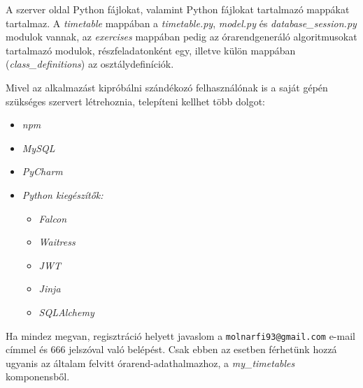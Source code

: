 A szerver oldal Python fájlokat, valamint Python fájlokat tartalmazó mappákat tartalmaz. A \textit{timetable} mappában a \textit{timetable.py}, \textit{model.py} és \textit{database\_session.py} modulok vannak, az \textit{exercises} mappában pedig az órarendgeneráló algoritmusokat tartalmazó modulok, részfeladatonként egy, illetve külön mappában (\textit{class\_definitions}) az osztálydefiníciók.

Mivel az alkalmazást kipróbálni szándékozó felhasználónak is a saját gépén szükséges szervert létrehoznia, telepíteni kellhet több dolgot:
\begin{itemize}
	\item \textit{npm}
	\item \textit{MySQL}
	\item \textit{PyCharm}
	\item \textit{Python kiegészítők:}
	\begin{itemize}
		\item \textit{Falcon}
		\item \textit{Waitress}
		\item \textit{JWT}
		\item \textit{Jinja}
		\item \textit{SQLAlchemy}
	\end{itemize}
\end{itemize}

Ha mindez megvan, regisztráció helyett javaslom a \texttt{molnarfi93@gmail.com} e-mail címmel és 666 jelszóval való belépést. Csak ebben az esetben férhetünk hozzá ugyanis az általam felvitt órarend-adathalmazhoz, a \textit{my\_timetables} komponensből.

